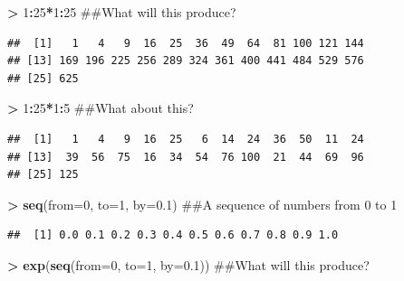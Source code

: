 \documentclass[]{krantz}
\makeatletter
\newenvironment{Shaded}{\begin{snugshade}}{\end{snugshade}}
\newcommand{\KeywordTok}[1]{\textcolor[rgb]{0.27,0.27,0.27}{\textbf{#1}}}
\newcommand{\DataTypeTok}[1]{\textcolor[rgb]{0.27,0.27,0.27}{#1}}
\newcommand{\DecValTok}[1]{\textcolor[rgb]{0.06,0.06,0.06}{#1}}
\newcommand{\FloatTok}[1]{\textcolor[rgb]{0.06,0.06,0.06}{#1}}
\newcommand{\StringTok}[1]{\textcolor[rgb]{0.5,0.5,0.5}{#1}}
\newcommand{\OperatorTok}[1]{\textcolor[rgb]{0.43,0.43,0.43}{\textbf{#1}}}
\newcommand{\NormalTok}[1]{#1}
\newenvironment{kframe}{%
\medskip{}
\setlength{\fboxsep}{.8em}
 \def\at@end@of@kframe{}%
 \ifinner\ifhmode%
  \def\at@end@of@kframe{\end{minipage}}%
  \begin{minipage}{\columnwidth}%
 \fi\fi%
 \def\FrameCommand##1{\hskip\@totalleftmargin \hskip-\fboxsep
 \colorbox{shadecolor}{##1}\hskip-\fboxsep
     \hskip-\linewidth \hskip-\@totalleftmargin \hskip\columnwidth}%
 \MakeFramed {\advance\hsize-\width
   \@totalleftmargin\z@ \linewidth\hsize
   \@setminipage}}%
 {\par\unskip\endMakeFramed%
 \at@end@of@kframe}
\renewenvironment{Shaded}{\begin{kframe}}{\end{kframe}}
\theoremstyle{definition}
\theoremstyle{definition}
\theoremstyle{definition}
\theoremstyle{remark}
\makeatother
\begin{document}
\begin{Shaded}
\begin{Highlighting}[]
\OperatorTok{>}\StringTok{ }\DecValTok{1}\OperatorTok{:}\DecValTok{25}\OperatorTok{*}\DecValTok{1}\OperatorTok{:}\DecValTok{25}\NormalTok{ ##What will this produce?}
\end{Highlighting}
\end{Shaded}

\begin{verbatim}
##  [1]   1   4   9  16  25  36  49  64  81 100 121 144
## [13] 169 196 225 256 289 324 361 400 441 484 529 576
## [25] 625
\end{verbatim}

\begin{Shaded}
\begin{Highlighting}[]
\OperatorTok{>}\StringTok{ }\DecValTok{1}\OperatorTok{:}\DecValTok{25}\OperatorTok{*}\DecValTok{1}\OperatorTok{:}\DecValTok{5}\NormalTok{ ##What about this?}
\end{Highlighting}
\end{Shaded}

\begin{verbatim}
##  [1]   1   4   9  16  25   6  14  24  36  50  11  24
## [13]  39  56  75  16  34  54  76 100  21  44  69  96
## [25] 125
\end{verbatim}

\begin{Shaded}
\begin{Highlighting}[]
\OperatorTok{>}\StringTok{ }\KeywordTok{seq}\NormalTok{(}\DataTypeTok{from=}\DecValTok{0}\NormalTok{, }\DataTypeTok{to=}\DecValTok{1}\NormalTok{, }\DataTypeTok{by=}\FloatTok{0.1}\NormalTok{) ##A sequence of numbers from 0 to 1}
\end{Highlighting}
\end{Shaded}

\begin{verbatim}
##  [1] 0.0 0.1 0.2 0.3 0.4 0.5 0.6 0.7 0.8 0.9 1.0
\end{verbatim}

\begin{Shaded}
\begin{Highlighting}[]
\OperatorTok{>}\StringTok{ }\KeywordTok{exp}\NormalTok{(}\KeywordTok{seq}\NormalTok{(}\DataTypeTok{from=}\DecValTok{0}\NormalTok{, }\DataTypeTok{to=}\DecValTok{1}\NormalTok{, }\DataTypeTok{by=}\FloatTok{0.1}\NormalTok{)) ##What will this produce?}
\end{Highlighting}
\end{Shaded}
\end{document}
